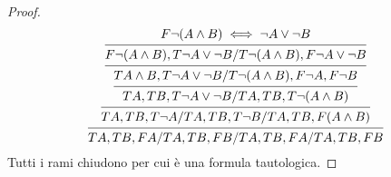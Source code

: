 \begin{proof}
\begin{equation*}
\begin{prooftree}
\hypo{F \neg(A \land B)  \iff  \neg A \lor \neg B}
\infer1 {F \neg(A \land B),T \neg A \lor \neg B/T \neg (A \land B),F \neg A \lor \neg B}
\infer1 {T A \land B,T \neg A \lor \neg B/T \neg(A \land B),F \neg A,F \neg B}
\infer1 {TA,TB,T \neg A \lor \neg B/TA,TB,T \neg(A \land B)}
\infer1 {TA,TB,T \neg A/TA,TB,T \neg B/TA,TB,F (A \land B)}
\infer1{TA,TB,FA/TA,TB,FB/TA,TB,FA/TA,TB,FB}
\end{prooftree}
\end{equation*}
Tutti i rami chiudono per cui è una formula tautologica.
\end{proof}
